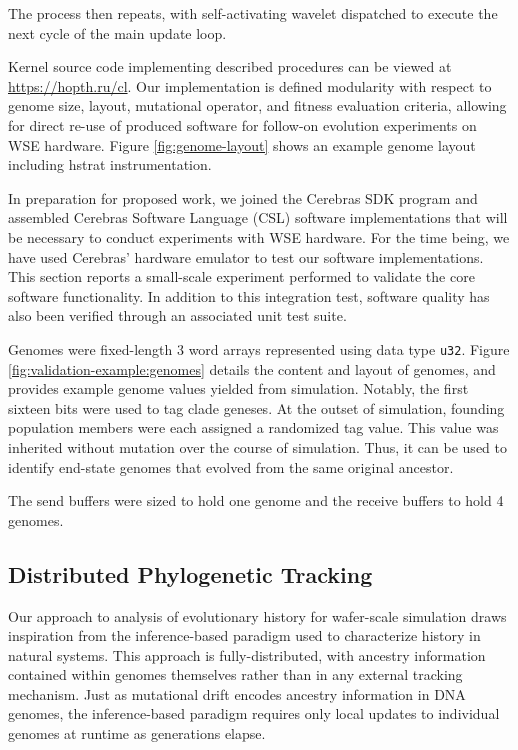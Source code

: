 The process then repeats, with self-activating wavelet dispatched to execute the next cycle of the main update loop.



Kernel source code implementing described procedures can be viewed at \url{https://hopth.ru/cl}.
Our implementation is defined modularity with respect to genome size, layout, mutational operator, and fitness evaluation criteria, allowing for direct re-use of produced software for follow-on evolution experiments on WSE hardware.
Figure \ref{fig:genome-layout} shows an example genome layout including hstrat instrumentation.


In preparation for proposed work, we joined the Cerebras SDK program \citep{selig2022cerebras} and assembled Cerebras Software Language (CSL) software implementations that will be necessary to conduct experiments with WSE hardware.
For the time being, we have used Cerebras' hardware emulator to test our software implementations.
This section reports a small-scale experiment performed to validate the core software functionality.
In addition to this integration test, software quality has also been verified through an associated unit test suite.

Genomes were fixed-length 3 word arrays represented using data type \texttt{u32}.
Figure \ref{fig:validation-example:genomes} details the content and layout of genomes, and provides example genome values yielded from simulation.
Notably, the first sixteen bits were used to tag clade geneses.
At the outset of simulation, founding population members were each assigned a randomized tag value.
This value was inherited without mutation over the course of simulation.
Thus, it can be used to identify end-state genomes that evolved from the same original ancestor.

The send buffers were sized to hold one genome and the receive buffers to hold 4 genomes.


\subsection{Distributed Phylogenetic Tracking}

Our approach to analysis of evolutionary history for wafer-scale simulation draws inspiration from the inference-based paradigm used to characterize history in natural systems.
This approach is fully-distributed, with ancestry information contained within genomes themselves rather than in any external tracking mechanism.
Just as mutational drift encodes ancestry information in DNA genomes, the inference-based paradigm requires only local updates to individual genomes at runtime as generations elapse.


